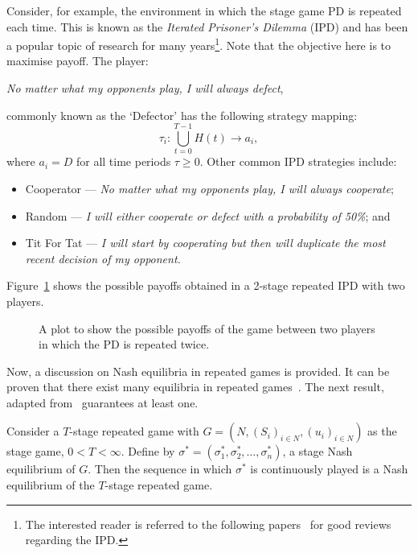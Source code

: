Consider, for example, the environment in which the stage game PD is repeated each time. This is known as the \textit{Iterated Prisoner's
Dilemma} (IPD) and has been a popular topic of research for many
years\footnote{The interested reader is referred to the following papers~\cite{Glynatsi2019,Jurisic2012,ORiordan2001} for
good reviews regarding the IPD.}. Note that the objective
here is to maximise payoff. The player: 
\begin{center}
    \textit{No matter what my opponents play, I will always defect},
\end{center}
commonly known as the `Defector' has the following strategy mapping:
\begin{equation}
    \tau_{i} : \bigcup_{t = 0}^{T-1}{H(t)} \to a_{i},    
\end{equation}
where \(a_{i}=D\) for all time periods \(\tau \ge 0\). Other common IPD
strategies include: 
\begin{itemize}
    \item Cooperator --- \textit{No matter what my opponents play, I will always
    cooperate};
    \item Random --- \textit{I will either cooperate or defect with a probability of
    50\%}; and
    \item Tit For Tat --- \textit{I will start by cooperating but then will 
    duplicate the most recent decision of my opponent.}
\end{itemize}

Figure~\ref{fig:2-stage_payoff_plot} shows the possible payoffs obtained in
a 2-stage repeated IPD with two players.

\begin{figure}
    \centering
    \resizebox{0.5\textwidth}{!}{}
    \caption{A plot to show the possible payoffs of the game between two players in which the PD is repeated twice.}\label{fig:2-stage_payoff_plot}
\end{figure}

Now, a discussion on Nash equilibria in repeated games is provided. It can be
proven that there exist many equilibria in repeated
games~\cite{Friedman1971}. The next result,
adapted from~\cite{Knight2019,maschler_solan_zamir_2013} guarantees at least
one.

\newpage
\begin{theorem}\label{thm:seq_of_stage_NE} 
    Consider a \(T\)-stage repeated game with \(G=(N, {(S_{i})}_{i \in N},
    {(u_{i})}_{i \in N})\) as the stage game, \(0 < T < \infty \). Define by
    \( {\sigma}^{*} = (\sigma_{1}^{*}, \sigma_{2}^{*}, \ldots,
    \sigma_{n}^{*})\), a stage Nash equilibrium of \(G\). Then the sequence in
    which \({\sigma}^{*}\) is continuously played is a Nash equilibrium of the
    \(T\)-stage repeated game.
\end{theorem}

